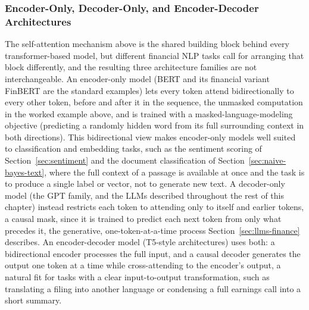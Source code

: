 \documentclass[../ai_in_finance]{subfiles}
\begin{document}
\subsubsection*{Encoder-Only, Decoder-Only, and Encoder-Decoder Architectures}

The self-attention mechanism above is the shared building block behind every transformer-based model, but different financial NLP tasks call
for arranging that block differently, and the resulting three architecture families are not interchangeable. An encoder-only model
(BERT and its financial variant FinBERT are the standard examples) lets every token attend bidirectionally to every other token, before and after
it in the sequence, the unmasked computation in the worked example above, and is trained with a masked-language-modeling objective
(predicting a randomly hidden word from its full surrounding context in both directions). This bidirectional view makes encoder-only models well
 suited to classification and embedding tasks, such as the sentiment scoring of Section~\ref{sec:sentiment} and the document classification of
 Section~\ref{sec:naive-bayes-text}, where the full context of a passage is available at once and the task is to produce a single label or vector,
 not to generate new text. A decoder-only model (the GPT family, and the LLMs described throughout the rest of this chapter) instead restricts
 each token to attending only to itself and earlier tokens, a causal mask, since it is trained to predict each next token from only what precedes
 it, the generative, one-token-at-a-time process Section~\ref{sec:llms-finance} describes. An encoder-decoder model (T5-style architectures)
 uses both: a bidirectional encoder processes the full input, and a causal decoder generates the output one token at a time while cross-attending
 to the encoder's output, a natural fit for tasks with a clear input-to-output transformation, such as translating a filing into another language
 or condensing a full earnings call into a short summary.
\end{document}
